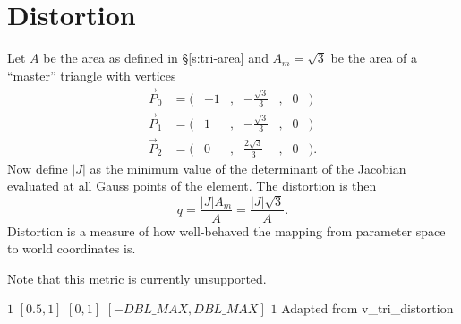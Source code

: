 \section{Distortion\label{s:tri-distortion}}

Let $A$ be the area as defined in \S\ref{s:tri-area}
and $A_m = \sqrt{3}$ be the area of a ``master'' triangle with vertices
\[
\begin{array}{lcrcrcrl}
  \vec P_0 &= (&-1&,& -\frac{ \sqrt{3}}{3}&,& 0&)\\
  \vec P_1 &= (& 1&,& -\frac{ \sqrt{3}}{3}&,& 0&)\\
  \vec P_2 &= (& 0&,&  \frac{2\sqrt{3}}{3}&,& 0&).
\end{array}
\]
Now define $|J|$ as the minimum value of the
determinant of the Jacobian evaluated at all Gauss points of the element.
The distortion is then
\[
q = \frac{|J| A_m}{A} = \frac{|J|\sqrt{3}}{A}.
\]
Distortion is a measure of how well-behaved the mapping from
parameter space to world coordinates is.

Note that this metric is currently unsupported.

%
{$1$}%
{$[0.5,1]$}%
{$[0,1]$}%
{$[-DBL\_MAX,DBL\_MAX]$}%
{$1$}%
{Adapted from \cite{ideas:xx}}%
{v\_tri\_distortion}%

